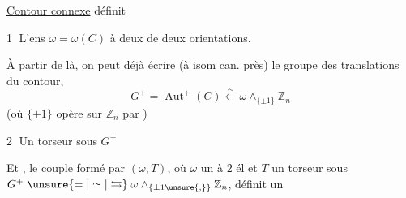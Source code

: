 \uline{Contour  connexe}  définit

\textcircled{1} L'ens $\omega=\omega(C)$ à deux  de  deux orientations.

À partir de là, on peut déjà écrire (à isom can. près) le groupe des translations du contour, 
\[
 G^+=\operatorname{Aut}^+(C)\xleftarrow{\sim}\omega\wedge_{\{\pm1\}}\mathbb Z_n
\]
(où $\{\pm1\}$ opère sur $\mathbb Z_n$ par )

\textcircled{2} Un torseur sous $G^+$

 Et , le couple formé par $(\omega,T)$, où $\omega$ un  à $2$ él et $T$ un torseur sous $G^+\mathrel{\unsure{=|\simeq|\leftrightarrows}}\omega\wedge_{\{\pm1\unsure{,}\}}\mathbb Z_n$, définit un
